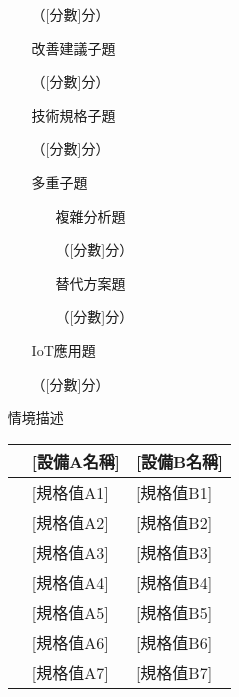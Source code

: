\documentclass[12pt,a4paper]{article}
\newcommand{\answerline}[1]{\underline{\hspace{#1}}}
\begin{document}
\begin{enumerate}
\begin{enumerate}[label=(\alph*)]
\answerline{15cm} （[分數]分）

\item [改善建議子題]

\answerline{15cm}

\answerline{15cm} （[分數]分）

\item [技術規格子題]

\answerline{15cm}

\answerline{15cm} （[分數]分）

\item [多重子題]

\begin{enumerate}[label=\roman*.]
\item [複雜分析題]

\answerline{15cm}

\answerline{15cm} （[分數]分）

\item [替代方案題]

\answerline{15cm}

\answerline{15cm} （[分數]分）

\end{enumerate}

\item [IoT應用題]

\answerline{15cm}

\answerline{15cm} （[分數]分）

\end{enumerate}

\item [情境描述]

\begin{center}
\begin{longtable}{|p{3cm}|p{5cm}|p{5cm}|}
\hline
& \textbf{[設備A名稱]} & \textbf{[設備B名稱]} \\
\hline
[規格項目1] & [規格值A1] & [規格值B1] \\
\hline
[規格項目2] & [規格值A2] & [規格值B2] \\
\hline
[規格項目3] & [規格值A3] & [規格值B3] \\
\hline
[規格項目4] & [規格值A4] & [規格值B4] \\
\hline
[規格項目5] & [規格值A5] & [規格值B5] \\
\hline
[規格項目6] & [規格值A6] & [規格值B6] \\
\hline
[規格項目7] & [規格值A7] & [規格值B7] \\
\hline
\end{longtable}
\end{center}


\end{enumerate}
\end{document}
